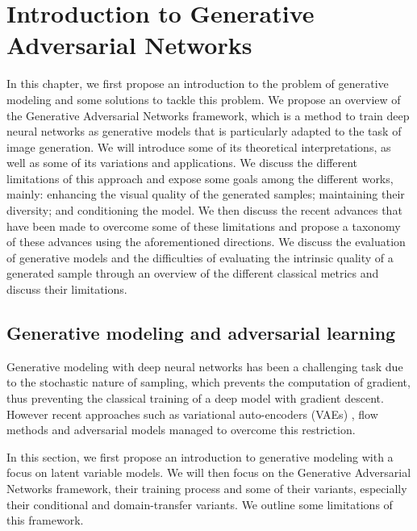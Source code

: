 \chapter{Introduction to Generative Adversarial Networks }
\label{chap:chapter1}

\begin{chapterabstract}
	In this chapter, we first propose an introduction to the problem of generative modeling and some solutions to tackle this problem. We propose an overview of the Generative Adversarial Networks \citep{Goodfellow2014} framework, which is a method to train deep neural networks as generative models that is particularly adapted to the task of image generation. We will introduce some of its theoretical interpretations, as well as some of its variations and applications. We discuss the different limitations of this approach and expose some goals among the different works, mainly: enhancing the visual quality of the generated samples; maintaining their diversity; and conditioning the model. We then discuss the recent advances that have been made to overcome some of these limitations and propose a taxonomy of these advances using the aforementioned directions. We discuss the evaluation of generative models and the difficulties of evaluating the intrinsic quality of a generated sample through an overview of the different classical metrics and discuss their limitations.
\end{chapterabstract}

\minitoc


\section{Generative modeling and adversarial learning}
Generative modeling with deep neural networks has been a challenging task due to the stochastic nature of sampling, which prevents the computation of gradient, thus preventing the classical training of a deep model with gradient descent. However recent approaches such as variational auto-encoders (\ac{VAE}s) \citep{Kingma2014b}, flow methods \citep{Dinh2017, Kingma2018} and adversarial models \citep{Goodfellow2014} managed to overcome this restriction. 

In this section, we first propose an introduction to generative modeling with a focus on latent variable models. We will then focus on the Generative Adversarial Networks \citep{Goodfellow2014} framework, their training process  and some of their variants, especially their conditional and domain-transfer variants. We outline some limitations of this framework.


